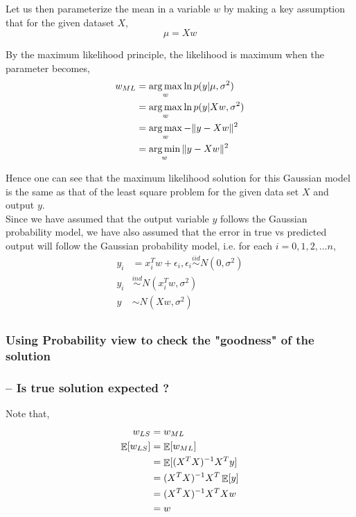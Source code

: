 \documentclass{article}
\begin{document}
Let us then parameterize the mean in a variable $w$ by making a key assumption that for the given dataset $X$,
\begin{equation*}
    \mu = Xw
\end{equation*}

By the maximum likelihood principle, the likelihood is maximum when the parameter becomes, 
\begin{align*}
    w_{ML} &= \operatorname*{arg\,max}_w \ln{p(y\vert \mu, \sigma^2)}\\
        &= \operatorname*{arg\,max}_w \ln{p(y\vert Xw, \sigma^2)}\\
        & = \operatorname*{arg\,max}_w -\Vert y-Xw \Vert^2\\
        & = \operatorname*{arg\,min}_w \Vert y-Xw \Vert^2
\end{align*}

Hence one can see that the maximum likelihood solution for this Gaussian model is the same as that of the least square problem for the given data set $X$ and output $y$.\\
Since we have assumed that the output variable $y$ follows the Gaussian probability model, we have also assumed that the error in true vs predicted output will follow the Gaussian probability model, i.e. for each $i = 0,1,2,\dots n$,
\begin{align*}
    y_i &= x_i^Tw+\epsilon_i, \epsilon_i \stackrel{iid}{\sim} N(0,\sigma^2)\\
    y_i &\stackrel{ind}{\sim} N(x_i^Tw,\sigma^2)\\
    y &\sim N(Xw,\sigma^2)\\
\end{align*}

\subsubsection{Using Probability view to check the "goodness" of the solution}

\subsubsection{-- Is true solution expected ?}

Note that,
\begin{align*}
    w_{LS} &= w_{ML}\\
    \operatorname*{\mathop{\mathbb{E}}}[w_{LS}] &= \operatorname*{\mathop{\mathbb{E}}}[w_{ML}]\\
    &= \operatorname*{\mathop{\mathbb{E}}}[(X^TX)^{-1}X^Ty]\\
    &= (X^TX)^{-1}X^T\operatorname*{\mathop{\mathbb{E}}}[y]\\
    &= (X^TX)^{-1}X^TXw\\
    &= w\\
\end{align*}
\end{document}
